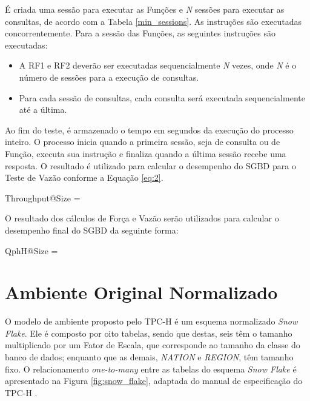 É criada uma sessão para executar as Funções e \textit{N} sessões para executar as consultas, de acordo com a Tabela \ref{min_sessions}. As instruções são executadas concorrentemente. Para a sessão das Funções, as seguintes instruções são executadas:

\begin{itemize}
	\item A RF1 e RF2 deverão ser executadas sequencialmente \textit{N} vezes, onde \textit{N} é o número de sessões para a execução de consultas.
	\item Para cada sessão de consultas, cada consulta será executada sequencialmente até a última.
\end{itemize}

Ao fim do teste, é armazenado o tempo em segundos da execução do processo inteiro. O processo inicia quando a primeira sessão, seja de consulta ou de Função, executa sua instrução e finaliza quando a última sessão recebe uma resposta. O resultado é utilizado para calcular o desempenho do SGBD para o Teste de Vazão conforme a Equação \ref{eq:2}.

\begin{myequation}%
\label{eq:2}
{\scriptstyle Throughput@Size} =  %
\end{myequation}
%

O resultado dos cálculos de Força e Vazão serão utilizados para calcular o desempenho final do SGBD da seguinte forma:

\begin{myequation}%
\label{eq:3}
{ \scriptstyle QphH@Size =  } %
\end{myequation}
%

\section{Ambiente Original Normalizado}
\label{ambiente_1}

O modelo de ambiente proposto pelo TPC-H é um esquema normalizado \textit{Snow Flake}. Ele é composto por oito tabelas, sendo que destas, seis têm o tamanho multiplicado por um Fator de Escala, que corresponde ao tamanho da classe do banco de dados; enquanto que as demais, \textit{NATION} e \textit{REGION}, têm tamanho fixo. O relacionamento \textit{one-to-many} entre as tabelas do esquema \textit{Snow Flake} é apresentado na Figura \ref{fig:snow_flake}, adaptada do manual de especificação do TPC-H \cite{tpc2017specs}.

